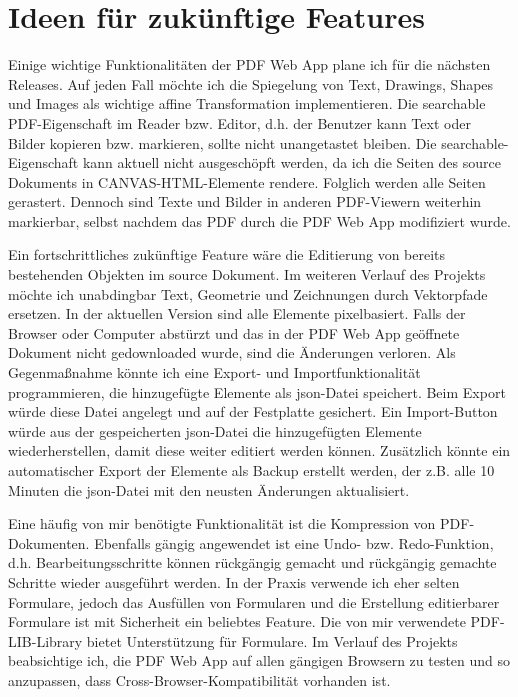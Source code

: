 \section{Ideen für zukünftige Features}
Einige wichtige Funktionalitäten der PDF Web App plane ich für die nächsten Releases. Auf jeden Fall möchte ich die Spiegelung von Text, Drawings, Shapes und Images als wichtige affine Transformation implementieren. Die searchable PDF-Eigenschaft im Reader bzw. Editor, d.h. der Benutzer kann Text oder Bilder kopieren bzw. markieren, sollte nicht unangetastet bleiben. Die searchable-Eigenschaft kann aktuell nicht ausgeschöpft werden, da ich die Seiten des source Dokuments in CANVAS-HTML-Elemente rendere. Folglich werden alle Seiten gerastert. Dennoch sind Texte und Bilder in anderen PDF-Viewern weiterhin markierbar, selbst nachdem das PDF durch die PDF Web App modifiziert wurde.
\par
Ein fortschrittliches zukünftige Feature wäre die Editierung von bereits bestehenden Objekten im source Dokument. Im weiteren Verlauf des Projekts möchte ich unabdingbar Text, Geometrie und Zeichnungen durch Vektorpfade ersetzen. In der aktuellen Version sind alle Elemente pixelbasiert. Falls der Browser oder Computer abstürzt und das in der PDF Web App geöffnete Dokument nicht gedownloaded wurde, sind die Änderungen verloren. Als Gegenmaßnahme könnte ich eine Export- und Importfunktionalität programmieren, die hinzugefügte Elemente als \gls{json}-Datei speichert. Beim Export würde diese Datei angelegt und auf der Festplatte gesichert. Ein Import-Button würde aus der gespeicherten \gls{json}-Datei die hinzugefügten Elemente wiederherstellen, damit diese weiter editiert werden können. Zusätzlich könnte ein automatischer Export der Elemente als Backup erstellt werden, der z.B. alle 10 Minuten die \gls{json}-Datei mit den neusten Änderungen aktualisiert.
\par
Eine häufig von mir benötigte Funktionalität ist die Kompression von PDF-Dokumenten. Ebenfalls gängig angewendet ist eine Undo- bzw. Redo-Funktion, d.h. Bearbeitungsschritte können rückgängig gemacht und rückgängig gemachte Schritte wieder ausgeführt werden. In der Praxis verwende ich eher selten Formulare, jedoch das Ausfüllen von Formularen und die Erstellung editierbarer Formulare ist mit Sicherheit ein beliebtes Feature. Die von mir verwendete PDF-LIB-Library bietet Unterstützung für Formulare. Im Verlauf des Projekts beabsichtige ich, die PDF Web App auf allen gängigen Browsern zu testen und so anzupassen, dass Cross-Browser-Kompatibilität vorhanden ist.